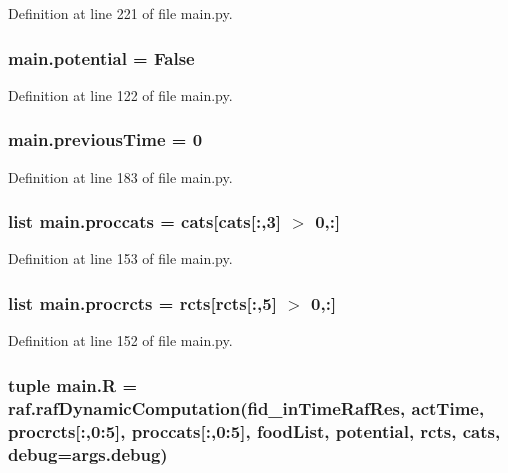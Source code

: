 Definition at line 221 of file main.\-py.

\hypertarget{a00111_abe4c267a63409b1b7cd9c6aaf0779b4a}{
\subsubsection[{potential}]{\setlength{\rightskip}{0pt plus 5cm}main.\-potential = False}}\label{a00111_abe4c267a63409b1b7cd9c6aaf0779b4a}


Definition at line 122 of file main.\-py.

\hypertarget{a00111_a6a6de947e3b6ada5ea6e761d208228bd}{
\subsubsection[{previous\-Time}]{\setlength{\rightskip}{0pt plus 5cm}main.\-previous\-Time = 0}}\label{a00111_a6a6de947e3b6ada5ea6e761d208228bd}


Definition at line 183 of file main.\-py.

\hypertarget{a00111_a4e3c4b627d098aef6c7905cb20683e07}{
\subsubsection[{proccats}]{\setlength{\rightskip}{0pt plus 5cm}list main.\-proccats = {\bf cats}\mbox{[}{\bf cats}\mbox{[}\-:,3\mbox{]} $>$ 0,\-:\mbox{]}}}\label{a00111_a4e3c4b627d098aef6c7905cb20683e07}


Definition at line 153 of file main.\-py.

\hypertarget{a00111_a2120e8355b3501aed0114a74091d56c1}{
\subsubsection[{procrcts}]{\setlength{\rightskip}{0pt plus 5cm}list main.\-procrcts = {\bf rcts}\mbox{[}{\bf rcts}\mbox{[}\-:,5\mbox{]} $>$ 0,\-:\mbox{]}}}\label{a00111_a2120e8355b3501aed0114a74091d56c1}


Definition at line 152 of file main.\-py.

\hypertarget{a00111_aa51f04a64cdea4fbde3c2d484d06d443}{
\subsubsection[{R}]{\setlength{\rightskip}{0pt plus 5cm}tuple main.\-R = raf.\-raf\-Dynamic\-Computation({\bf fid\-\_\-in\-Time\-Raf\-Res}, {\bf act\-Time}, {\bf procrcts}\mbox{[}\-:,0\-:5\mbox{]}, {\bf proccats}\mbox{[}\-:,0\-:5\mbox{]}, {\bf food\-List}, {\bf potential}, {\bf rcts}, {\bf cats}, debug=args.\-debug)}}\label{a00111_aa51f04a64cdea4fbde3c2d484d06d443}


